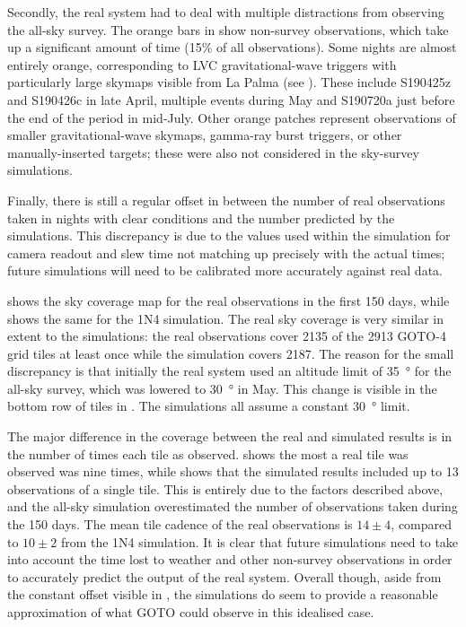 \begin{colsection}
\begin{colsection}
Secondly, the real system had to deal with multiple distractions from observing the all-sky survey. The orange bars in  show non-survey observations, which take up a significant amount of time (15\% of all observations). Some nights are almost entirely orange, corresponding to LVC gravitational-wave triggers with particularly large skymaps visible from La Palma (see ). These include S190425z and S190426c in late April, multiple events during May and S190720a just before the end of the period in mid-July. Other orange patches represent observations of smaller gravitational-wave skymaps, gamma-ray burst triggers, or other manually-inserted targets; these were also not considered in the sky-survey simulations.

Finally, there is still a regular offset in  between the number of real observations taken in nights with clear conditions and the number predicted by the simulations. This discrepancy is due to the values used within the simulation for camera readout and slew time not matching up precisely with the actual times; future simulations will need to be calibrated more accurately against real data.

 shows the sky coverage map for the real observations in the first 150 days, while  shows the same for the 1N4 simulation. The real sky coverage is very similar in extent to the simulations: the real observations cover 2135 of the 2913 GOTO-4 grid tiles at least once while the simulation covers 2187. The reason for the small discrepancy is that initially the real system used an altitude limit of \SI{35}{\degree} for the all-sky survey, which was lowered to \SI{30}{\degree} in May. This change is visible in the bottom row of tiles in . The simulations all assume a constant \SI{30}{\degree} limit.

The major difference in the coverage between the real and simulated results is in the number of times each tile as observed.  shows the most a real tile was observed was nine times, while  shows that the simulated results included up to 13 observations of a single tile. This is entirely due to the factors described above, and the all-sky simulation overestimated the number of observations taken during the 150 days. The mean tile cadence of the real observations is $14\pm4$, compared to $10\pm2$ from the 1N4 simulation. It is clear that future simulations need to take into account the time lost to weather and other non-survey observations in order to accurately predict the output of the real system. Overall though, aside from the constant offset visible in , the simulations do seem to provide a reasonable approximation of what GOTO could observe in this idealised case.


\end{colsection}
\end{colsection}
